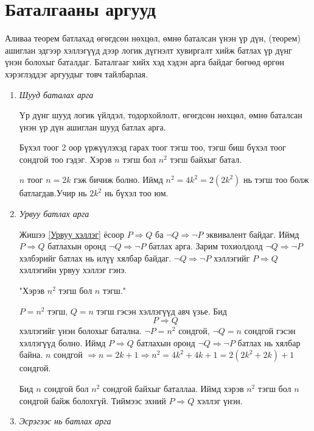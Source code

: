 \section{Баталгааны аргууд}
Аливаа теорем батлахад өгөгдсөн нөхцөл, өмнө баталсан үнэн үр дүн, (теорем) ашиглан эдгээр хэллэгүүд дээр логик дүгнэлт хувиргалт хийж батлах үр дүнг үнэн болохыг баталдаг. Баталгааг хийх хэд хэдэн арга байдаг бөгөөд өргөн хэрэглэддэг аргуудыг товч тайлбарлая.
\begin{enumerate}
    \item \it{Шууд баталах арга}
    
    Үр дүнг шууд логик үйлдэл, тодорхойлолт, өгөгдсөн нөхцөл, өмнө баталсан үнэн үр дүн ашиглан шууд батлах арга.
\begin{example}
Бүхэл тоог 2 оор үржүүлэхэд гарах тоог тэгш тоо, тэгш биш бүхэл тоог сондгой тоо гэдэг. Хэрэв $n$ тэгш бол $n^2$ тэгш байхыг батал. 
\begin{solution}
$n$ тоог $n=2k$ гэж бичиж болно. Иймд $n^2=4k^2=2(2k^2)$ нь тэгш тоо болж батлагдав.Учир нь $2k^2$ нь бүхэл тоо юм.
\end{solution}
\end{example}
\item \it{Урвуу батлах арга} 

Жишээ \ref{Урвуу хэллэг} ёсоор $P\Rightarrow Q$ ба  $\lnot Q\Rightarrow \lnot P$ эквивалент байдаг. Иймд $P\Rightarrow Q$ батлахын оронд $\lnot Q\Rightarrow \lnot P$ батлах арга. Зарим тохиолдолд $\lnot Q\Rightarrow \lnot P$ хэлбэрийг батлах нь илүү хялбар байдаг. $\lnot Q\Rightarrow \lnot P$ хэллэгийг $P\Rightarrow Q$ хэллэгийн урвуу хэллэг гэнэ.
\begin{example}
"Хэрэв $n^2$ тэгш бол $n$ тэгш." 
\begin{solution} $P=n^2$ тэгш, $Q=n$ тэгш гэсэн хэллэгүүд авч үзье. Бид $$P\Rightarrow Q$$ хэллэгийг үнэн болохыг батална. $\lnot P=n^2$ сондгой, $\lnot Q=n$ сондгой гэсэн хэллэгүүд болно. Иймд $P\Rightarrow Q$ батлахын оронд $\lnot Q\Rightarrow \lnot P$ батлах нь хялбар байна.
$n$ сондгой $\Rightarrow n=2k+1\Rightarrow n^2=4k^2+4k+1=2(2k^2+2k)+1$ сондгой. 

Бид $n$ сондгой бол  $n^2$ сондгой байхыг баталлаа. Иймд хэрэв $n^2$ тэгш бол $n$ сондгой байж болохгүй. Тиймээс эхний $P\Rightarrow Q$ хэллэг үнэн.
\end{solution}
\end{example}
\item \it{Эсрэгээс нь батлах арга} 


\end{enumerate}

